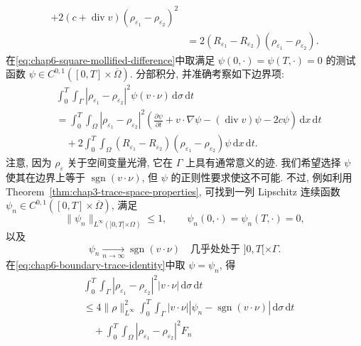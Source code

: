 \begin{sloppypar}
\begin{Proof}
\begin{itemize}
\begin{equation}
\begin{aligned}
 +2(c+\operatorname{div}v)(\rho_{\varepsilon_1}-\rho_{\varepsilon_2})^2\\
 &=2(R_{\varepsilon_1}-R_{\varepsilon_2})
 (\rho_{\varepsilon_1}-\rho_{\varepsilon_2}).
 \end{aligned}
 \label{eq:chap6-square-mollified-difference}
 \end{equation}
 在\eqref{eq:chap6-square-mollified-difference}中取满足 $\psi(0,\cdot)=\psi(T,\cdot)=0$ 的测试函数 $\psi\in C^{0,1}([0,T]\times\overline\Omega)$. 分部积分, 并准确考察如下边界项:
 \begin{equation}
 \begin{aligned}
 &\int_0^T\int_\Gamma|\rho_{\varepsilon_1}-\rho_{\varepsilon_2}|^2
 \psi(v\cdot\nu)\,\mathrm d\sigma\,\mathrm dt\\
 &=\int_0^T\int_\Omega|\rho_{\varepsilon_1}-\rho_{\varepsilon_2}|^2
 \left(\frac{\partial\psi}{\partial t}+v\cdot\nabla\psi
 -(\operatorname{div}v)\psi-2c\psi\right)\,\mathrm dx\,\mathrm dt\\
 &\quad+2\int_0^T\int_\Omega(R_{\varepsilon_1}-R_{\varepsilon_2})
 (\rho_{\varepsilon_1}-\rho_{\varepsilon_2})\psi\,\mathrm dx\,\mathrm dt.
 \end{aligned}
 \label{eq:chap6-boundary-trace-identity}
 \end{equation}
 注意, 因为 $\rho_\varepsilon$ 关于空间变量光滑, 它在 $\Gamma$ 上具有通常意义的迹. 我们希望选择 $\psi$ 使其在边界上等于 $\operatorname{sgn}(v\cdot\nu)$, 但 $\psi$ 的正则性要求使这不可能. 不过, 例如利用 Theorem~\ref{thm:chap3-trace-space-properties}, 可找到一列 Lipschitz 连续函数 $\psi_n\in C^{0,1}([0,T]\times\overline\Omega)$, 满足
 \[
  \|\psi_n\|_{L^\infty(]0,T[\times\Omega)}\leq1,
  \qquad \psi_n(0,\cdot)=\psi_n(T,\cdot)=0,
 \]
 以及
 \begin{equation}
  \psi_n\xrightarrow[n\to\infty]{}\operatorname{sgn}(v\cdot\nu)
  \quad\text{几乎处处于 } ]0,T[\times\Gamma.
 \label{eq:chap6-sign-boundary-approximation}
 \end{equation}
 在\eqref{eq:chap6-boundary-trace-identity}中取 $\psi=\psi_n$, 得
 \begin{equation}
 \begin{aligned}
 &\int_0^T\int_\Gamma|\rho_{\varepsilon_1}-\rho_{\varepsilon_2}|^2
 |v\cdot\nu|\,\mathrm d\sigma\,\mathrm dt\\
 &\leq4\|\rho\|_{L^\infty}^2
 \int_0^T\int_\Gamma|v\cdot\nu|
 |\psi_n-\operatorname{sgn}(v\cdot\nu)|\,\mathrm d\sigma\,\mathrm dt\\
 &\quad+\int_0^T\int_\Omega|\rho_{\varepsilon_1}-\rho_{\varepsilon_2}|^2F_n

\end{aligned}
\end{equation}
\end{itemize}
\end{Proof}
\end{sloppypar}
